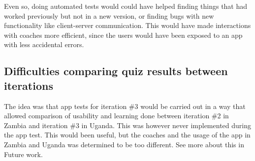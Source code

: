 Even so, doing automated tests would could have helped finding things that had worked previously but not in a new version, or finding bugs with new functionality like client-server communication. This would have made interactions with coaches more efficient, since the users would have been exposed to an app with less accidental errors.

\subsection{Difficulties comparing quiz results between iterations}
The idea was that app tests for iteration \#3 would be carried out in a way that allowed comparison of usability and learning done between iteration \#2 in Zambia and iteration \#3 in Uganda. This was however never implemented during the app test. This would been useful, but the coaches and the usage of the app in Zambia and Uganda was determined to be too different. See more about this in Future work.
